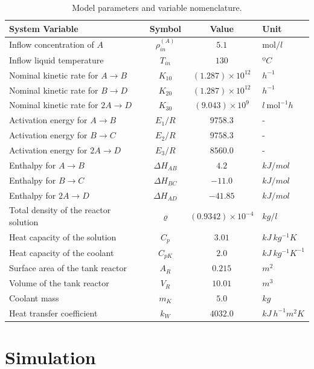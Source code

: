 \documentclass[a4paper,11pt]{book}
\numberwithin{figure}{chapter}
\numberwithin{equation}{chapter}
\numberwithin{table}{chapter}
\theoremstyle{definition}
\begin{document}
\begin{table}[ht]
  \centering
	\begin{tabular}{l | c | c l }
	\textbf{System Variable} & \textbf{Symbol} & \textbf{Value} & \textbf{Unit} \\
	\hline
	Inflow concentration of $A$ & $\rho^{(A)}_{in}$ 	& $5.1$		& $\text{mol}/l$ \\
	Inflow liquid temperature & $T_{in}$ 	& $130$		& $º C$ \\
	Nominal kinetic rate for $A \rightarrow B$ & $K_{10}$	& $(1.287)\times 10^{12}$	& $h^{-1}$ \\
	Nominal kinetic rate for $B \rightarrow D$ & $K_{20}$	& $(1.287)\times 10^{12}$	& $h^{-1}$ \\
	Nominal kinetic rate for $2A \rightarrow D$ & $K_{30}$	& $(9.043)\times 10^{9}$	& $l\  \text{mol}^{-1} h $ \\
	Activation energy for $A \rightarrow B$ & $E_{1}/R$	& $9758.3$	& - \\
	Activation energy for $B \rightarrow C$ & $E_{2}/R$	& $9758.3$	& - \\
	Activation energy for $2A \rightarrow D$ & $E_{3}/R$	& $8560.0$	& - \\
	Enthalpy for $A \rightarrow B$ & $\Delta H_{AB}$	& $4.2$	& $kJ/mol$ \\
	Enthalpy for $B \rightarrow C$ & $\Delta H_{BC}$	& $-11.0$	& $kJ/mol$ \\
	Enthalpy for $2A \rightarrow D$ & $\Delta H_{AD}$	& $-41.85$	& $kJ/mol$ \\
	Total density of the reactor solution & $\varrho$ & $(0.9342)\times 10^{-4}$ & $kg/l$ \\
	Heat capacity of the solution & $C_p$ & $3.01$ & $kJ\ kg^{-1} K$ \\
	Heat capacity of the coolant & $C_{pK}$ & $2.0$ & $kJ\ kg^{-1} K^{-1}$ \\
	Surface area of the tank reactor & $A_R$ & $0.215$ & $m^2$ \\
	Volume of the tank reactor & $V_R$ & $10.01$ & $m^3$ \\
	Coolant mass & $m_K$ & $5.0$ & $kg$ \\
	Heat transfer coefficient & $k_W$ & $4032.0$ & $kJ\ h^{-1} m^2 K$ \\
  \end{tabular} 
  \caption{Model parameters and variable nomenclature.}
  \label{table:exo_parameters} 
\end{table} \vskip0.25cm


\section{Simulation}
\end{document}
